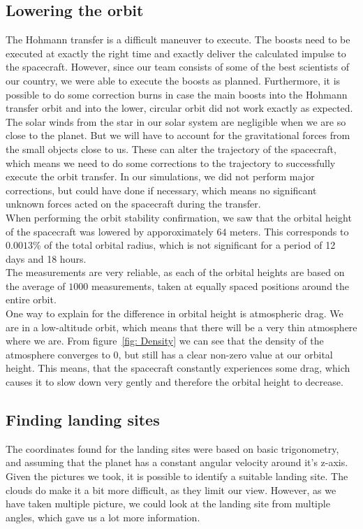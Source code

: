 \documentclass[reprint,english,notitlepage]{revtex4-2}
\begin{document}
\subsection{Lowering the orbit}\label{subsec:lowering-the-orbit-disc}
    The Hohmann transfer is a difficult maneuver to execute.
    The boosts need to be executed at exactly the right time and exactly deliver the calculated impulse to the spacecraft.
    However, since our team consists of some of the best scientists of our country, we were able to execute the boosts as planned.
    Furthermore, it is possible to do some correction burns in case the main boosts into the Hohmann transfer orbit and into the lower, circular orbit did not work exactly as expected.\\
    The solar winds from the star in our solar system are negligible when we are so close to the planet.
    But we will have to account for the gravitational forces from the small objects close to us.
    These can alter the trajectory of the spacecraft, which means we need to do some corrections to the trajectory to successfully execute the orbit transfer.
    In our simulations, we did not perform major corrections, but could have done if necessary, which means no significant unknown forces acted on the spacecraft during the transfer.\\

    When performing the orbit stability confirmation, we saw that the orbital height of the spacecraft was lowered by apporoximately $64$ meters.
    This corresponds to $0.0013$\% of the total orbital radius, which is not significant for a period of 12 days and 18 hours.\\
    The measurements are very reliable, as each of the orbital heights are based on the average of $1000$ measurements, taken at equally spaced positions around the entire orbit.\\

    One way to explain for the difference in orbital height is atmospheric drag.
    We are in a low-altitude orbit, which means that there will be a very thin atmosphere where we are.
    From figure~\ref{fig: Density} we can see that the density of the atmosphere converges to 0, but still has a clear non-zero value at our orbital height.
    This means, that the spacecraft constantly experiences some drag, which causes it to slow down very gently and therefore the orbital height to decrease.


\subsection{Finding landing sites}\label{subsec:finding-landing-sites-disc}
    The coordinates found for the landing sites were based on basic trigonometry, and assuming that the planet has a constant angular velocity around it's z-axis.
    Given the pictures we took, it is possible to identify a suitable landing site.
    The clouds do make it a bit more difficult, as they limit our view.
    However, as we have taken multiple picture, we could look at the landing site from multiple angles, which gave us a lot more information.\\
\end{document}
